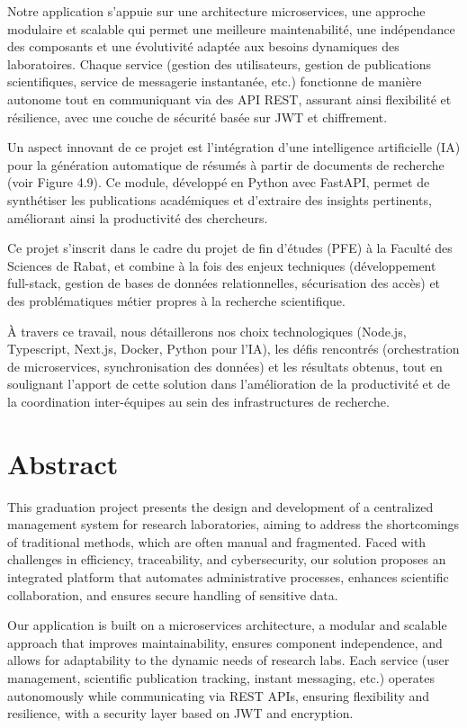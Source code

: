 \documentclass[12pt]{rapportPfe}
\begin{document}
Notre application s’appuie sur une architecture microservices, une approche modulaire et scalable qui permet une meilleure maintenabilité, une indépendance des composants et une évolutivité adaptée aux besoins dynamiques des laboratoires. Chaque service (gestion des utilisateurs, gestion de publications scientifiques, service de messagerie instantanée, etc.) fonctionne de manière autonome tout en communiquant via des API REST, assurant ainsi flexibilité et résilience, avec une couche de sécurité basée sur JWT et chiffrement.

Un aspect innovant de ce projet est l'intégration d'une intelligence artificielle (IA) pour la génération automatique de résumés à partir de documents de recherche (voir Figure 4.9). Ce module, développé en Python avec FastAPI, permet de synthétiser les publications académiques et d'extraire des insights pertinents, améliorant ainsi la productivité des chercheurs.

Ce projet s’inscrit dans le cadre du projet de fin d’études (PFE) à la Faculté des Sciences de Rabat, et combine à la fois des enjeux techniques (développement full-stack, gestion de bases de données relationnelles, sécurisation des accès) et des problématiques métier propres à la recherche scientifique.

À travers ce travail, nous détaillerons nos choix technologiques (Node.js, Typescript, Next.js, Docker, Python pour l'IA), les défis rencontrés (orchestration de microservices, synchronisation des données) et les résultats obtenus, tout en soulignant l’apport de cette solution dans l’amélioration de la productivité et de la coordination inter-équipes au sein des infrastructures de recherche.

\chapter*{Abstract}
This graduation project presents the design and development of a centralized management system for research laboratories, aiming to address the shortcomings of traditional methods, which are often manual and fragmented. Faced with challenges in efficiency, traceability, and cybersecurity, our solution proposes an integrated platform that automates administrative processes, enhances scientific collaboration, and ensures secure handling of sensitive data.

Our application is built on a microservices architecture, a modular and scalable approach that improves maintainability, ensures component independence, and allows for adaptability to the dynamic needs of research labs. Each service (user management, scientific publication tracking, instant messaging, etc.) operates autonomously while communicating via REST APIs, ensuring flexibility and resilience, with a security layer based on JWT and encryption.
\end{document}

